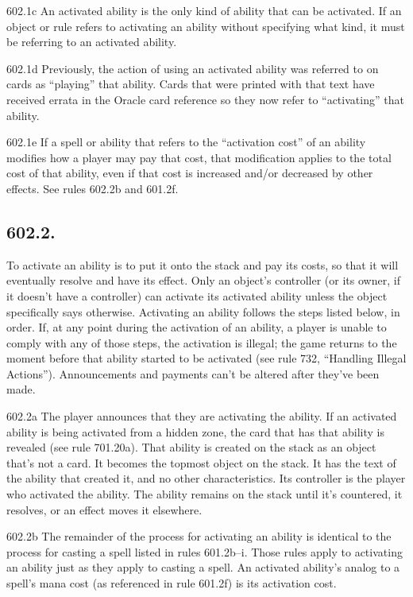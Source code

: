 602.1c An activated ability is the only kind of ability that can be activated. If an object or rule refers to activating an ability without specifying what kind, it must be referring to an activated ability.

602.1d Previously, the action of using an activated ability was referred to on cards as “playing” that ability. Cards that were printed with that text have received errata in the Oracle card reference so they now refer to “activating” that ability.

602.1e If a spell or ability that refers to the “activation cost” of an ability modifies how a player may pay that cost, that modification applies to the total cost of that ability, even if that cost is increased and/or decreased by other effects. See rules 602.2b and 601.2f.

\subsection*{602.2.}
To activate an ability is to put it onto the stack and pay its costs, so that it will eventually resolve and have its effect. Only an object’s controller (or its owner, if it doesn’t have a controller) can activate its activated ability unless the object specifically says otherwise. Activating an ability follows the steps listed below, in order. If, at any point during the activation of an ability, a player is unable to comply with any of those steps, the activation is illegal; the game returns to the moment before that ability started to be activated (see rule 732, “Handling Illegal Actions”). Announcements and payments can’t be altered after they’ve been made.

602.2a The player announces that they are activating the ability. If an activated ability is being activated from a hidden zone, the card that has that ability is revealed (see rule 701.20a). That ability is created on the stack as an object that’s not a card. It becomes the topmost object on the stack. It has the text of the ability that created it, and no other characteristics. Its controller is the player who activated the ability. The ability remains on the stack until it’s countered, it resolves, or an effect moves it elsewhere.

602.2b The remainder of the process for activating an ability is identical to the process for casting a spell listed in rules 601.2b–i. Those rules apply to activating an ability just as they apply to casting a spell. An activated ability’s analog to a spell’s mana cost (as referenced in rule 601.2f) is its activation cost.

